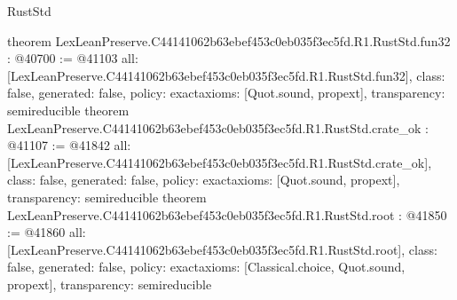 \begin{lexlean}{RustStd}
\begin{coremodule}
{}
theorem LexLeanPreserve.C44141062b63ebef453c0eb035f3ec5fd.R1.RustStd.fun32 : @40700 := @41103 {
  all: [LexLeanPreserve.C44141062b63ebef453c0eb035f3ec5fd.R1.RustStd.fun32],
  class: false,
  generated: false,
  policy: exact{axioms: [Quot.sound, propext]},
  transparency: semireducible
}
theorem LexLeanPreserve.C44141062b63ebef453c0eb035f3ec5fd.R1.RustStd.crate_ok : @41107 := @41842 {
  all: [LexLeanPreserve.C44141062b63ebef453c0eb035f3ec5fd.R1.RustStd.crate_ok],
  class: false,
  generated: false,
  policy: exact{axioms: [Quot.sound, propext]},
  transparency: semireducible
}
theorem LexLeanPreserve.C44141062b63ebef453c0eb035f3ec5fd.R1.RustStd.root : @41850 := @41860 {
  all: [LexLeanPreserve.C44141062b63ebef453c0eb035f3ec5fd.R1.RustStd.root],
  class: false,
  generated: false,
  policy: exact{axioms: [Classical.choice, Quot.sound, propext]},
  transparency: semireducible
}


\end{coremodule}
\end{lexlean}

